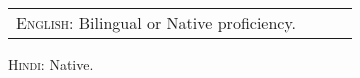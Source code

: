 %
%


\begin{tabular}{lrll}
	\textsc{English:} Bilingual or Native proficiency.
\end{tabular}
	 \textsc{Hindi:} Native. \\